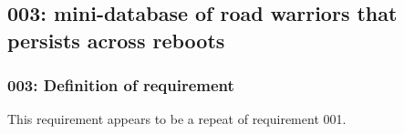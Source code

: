 \subsection{003: mini-database of road warriors that persists across reboots}
\subsubsection{003: Definition of requirement }

This requirement appears to be a repeat of requirement 001.



